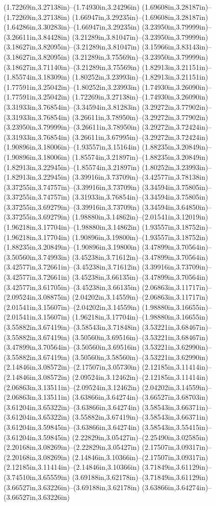 (1.72269in,3.27138in)--(1.74930in,3.24296in) (1.69608in,3.28187in)--(1.72269in,3.27138in) (1.66947in,3.29235in)--(1.69608in,3.28187in) (1.64286in,3.30283in)--(1.66947in,3.29235in) (3.23950in,3.79999in)--(3.26611in,3.84428in) (3.21289in,3.81047in)--(3.23950in,3.79999in) (3.18627in,3.82095in)--(3.21289in,3.81047in) (3.15966in,3.83143in)--(3.18627in,3.82095in) (3.21289in,3.75569in)--(3.23950in,3.79999in) (3.18627in,3.71140in)--(3.21289in,3.75569in) (1.82913in,3.21151in)--(1.85574in,3.18309in) (1.80252in,3.23993in)--(1.82913in,3.21151in) (1.77591in,3.25042in)--(1.80252in,3.23993in) (1.74930in,3.26090in)--(1.77591in,3.25042in) (1.72269in,3.27138in)--(1.74930in,3.26090in) (3.31933in,3.76854in)--(3.34594in,3.81283in) (3.29272in,3.77902in)--(3.31933in,3.76854in) (3.26611in,3.78950in)--(3.29272in,3.77902in) (3.23950in,3.79999in)--(3.26611in,3.78950in) (3.29272in,3.72424in)--(3.31933in,3.76854in) (3.26611in,3.67995in)--(3.29272in,3.72424in) (1.90896in,3.18006in)--(1.93557in,3.15164in) (1.88235in,3.20849in)--(1.90896in,3.18006in) (1.85574in,3.21897in)--(1.88235in,3.20849in) (1.82913in,3.22945in)--(1.85574in,3.21897in) (1.80252in,3.23993in)--(1.82913in,3.22945in) (3.39916in,3.73709in)--(3.42577in,3.78138in) (3.37255in,3.74757in)--(3.39916in,3.73709in) (3.34594in,3.75805in)--(3.37255in,3.74757in) (3.31933in,3.76854in)--(3.34594in,3.75805in) (3.37255in,3.69279in)--(3.39916in,3.73709in) (3.34594in,3.64850in)--(3.37255in,3.69279in) (1.98880in,3.14862in)--(2.01541in,3.12019in) (1.96218in,3.17704in)--(1.98880in,3.14862in) (1.93557in,3.18752in)--(1.96218in,3.17704in) (1.90896in,3.19800in)--(1.93557in,3.18752in) (1.88235in,3.20849in)--(1.90896in,3.19800in) (3.47899in,3.70564in)--(3.50560in,3.74993in) (3.45238in,3.71612in)--(3.47899in,3.70564in) (3.42577in,3.72661in)--(3.45238in,3.71612in) (3.39916in,3.73709in)--(3.42577in,3.72661in) (3.45238in,3.66135in)--(3.47899in,3.70564in) (3.42577in,3.61705in)--(3.45238in,3.66135in) (2.06863in,3.11717in)--(2.09524in,3.08875in) (2.04202in,3.14559in)--(2.06863in,3.11717in) (2.01541in,3.15607in)--(2.04202in,3.14559in) (1.98880in,3.16655in)--(2.01541in,3.15607in) (1.96218in,3.17704in)--(1.98880in,3.16655in) (3.55882in,3.67419in)--(3.58543in,3.71848in) (3.53221in,3.68467in)--(3.55882in,3.67419in) (3.50560in,3.69516in)--(3.53221in,3.68467in) (3.47899in,3.70564in)--(3.50560in,3.69516in) (3.53221in,3.62990in)--(3.55882in,3.67419in) (3.50560in,3.58560in)--(3.53221in,3.62990in) (2.14846in,3.08572in)--(2.17507in,3.05730in) (2.12185in,3.11414in)--(2.14846in,3.08572in) (2.09524in,3.12462in)--(2.12185in,3.11414in) (2.06863in,3.13511in)--(2.09524in,3.12462in) (2.04202in,3.14559in)--(2.06863in,3.13511in) (3.63866in,3.64274in)--(3.66527in,3.68703in) (3.61204in,3.65322in)--(3.63866in,3.64274in) (3.58543in,3.66371in)--(3.61204in,3.65322in) (3.55882in,3.67419in)--(3.58543in,3.66371in) (3.61204in,3.59845in)--(3.63866in,3.64274in) (3.58543in,3.55415in)--(3.61204in,3.59845in) (2.22829in,3.05427in)--(2.25490in,3.02585in) (2.20168in,3.08269in)--(2.22829in,3.05427in) (2.17507in,3.09317in)--(2.20168in,3.08269in) (2.14846in,3.10366in)--(2.17507in,3.09317in) (2.12185in,3.11414in)--(2.14846in,3.10366in) (3.71849in,3.61129in)--(3.74510in,3.65559in) (3.69188in,3.62178in)--(3.71849in,3.61129in) (3.66527in,3.63226in)--(3.69188in,3.62178in) (3.63866in,3.64274in)--(3.66527in,3.63226in) 